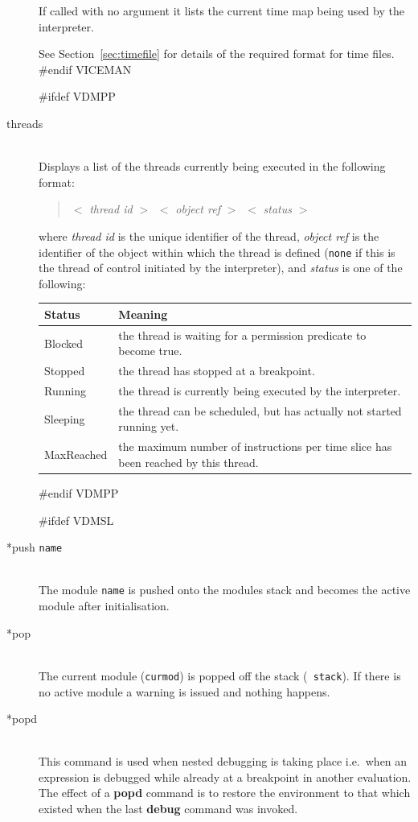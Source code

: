 \documentclass[\pformat,12pt]{article}
\begin{document}
\begin{description}
  If called with no argument it lists the current time map being
  used by the interpreter.
  
  See Section~\ref{sec:timefile} for details of the required
  format for time files.
#endif VICEMAN

#ifdef VDMPP
\item[threads]\mbox{}\\
  Displays a list of the threads currently being executed in the
following format:

\begin{quote}
  $<$ \textit{thread id} $>$\ $<$ \textit{object ref} $>$\ $<$
\textit{status} $>$
\end{quote}

where \textit{thread id} is the unique identifier of the thread,
\textit{object ref} is the identifier of the object within which the
thread is defined (\texttt{none} if this is the thread of control
initiated by the interpreter), and \textit{status} is one of the
following:

\begin{tabular}{lp{10cm}}\hline
Status & Meaning \\ \hline
Blocked    & the thread is waiting for a permission predicate to
             become true. \\ 
Stopped    & the thread has stopped at a breakpoint.\\
Running    & the thread is currently being executed by the
interpreter. \\
Sleeping   & the thread can be
scheduled, but has actually not started running yet.\\
MaxReached & the maximum number of instructions per time slice has
              been reached by this thread. \\ \hline 
\end{tabular}
#endif VDMPP

#ifdef VDMSL
\item[*push {\tt name}] \mbox{}\\
  The module {\tt name}\/ is pushed onto the modules stack and becomes
  the active module after initialisation.
  
\item[*pop] \mbox{}\\
  The current module ({\tt curmod}) is popped off the stack ({\tt
    stack}). If there is no active module a warning is issued and
  nothing happens.
  
\item[*popd] \mbox{}\\
  This command is used when nested debugging is taking place i.e.\ when
  an expression is debugged while already at a breakpoint in another
  evaluation. The effect of a
  \textbf{popd} command is to restore the environment to that which
  existed when the last \textbf{debug} command was invoked.


\end{description}
\end{document}
